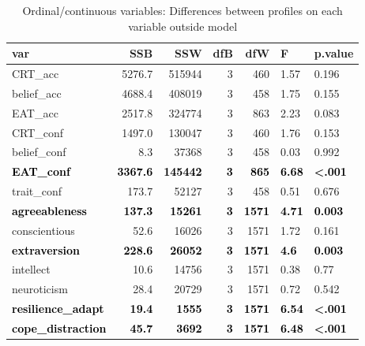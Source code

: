 \documentclass[]{article}
\begin{document}
\begin{table}[H]

\caption{\label{tab:unnamed-chunk-25}Ordinal/continuous variables: Differences between profiles on each variable outside model}
\centering
\fontsize{6}{8}\selectfont
\begin{tabular}[t]{lrrrrll}
\toprule
var & SSB & SSW & dfB & dfW & F & p.value\\
\midrule
CRT\_acc & 5276.7 & 515944 & 3 & 460 & 1.57 & 0.196\\
belief\_acc & 4688.4 & 408019 & 3 & 458 & 1.75 & 0.155\\
EAT\_acc & 2517.8 & 324774 & 3 & 863 & 2.23 & 0.083\\
CRT\_conf & 1497.0 & 130047 & 3 & 460 & 1.76 & 0.153\\
belief\_conf & 8.3 & 37368 & 3 & 458 & 0.03 & 0.992\\
\addlinespace
\textcolor{black}{\textbf{EAT\_conf}} & \textcolor{black}{\textbf{3367.6}} & \textcolor{black}{\textbf{145442}} & \textcolor{black}{\textbf{3}} & \textcolor{black}{\textbf{865}} & \textcolor{black}{\textbf{6.68}} & \textcolor{black}{\textbf{<.001}}\\
trait\_conf & 173.7 & 52127 & 3 & 458 & 0.51 & 0.676\\
\textcolor{black}{\textbf{agreeableness}} & \textcolor{black}{\textbf{137.3}} & \textcolor{black}{\textbf{15261}} & \textcolor{black}{\textbf{3}} & \textcolor{black}{\textbf{1571}} & \textcolor{black}{\textbf{4.71}} & \textcolor{black}{\textbf{0.003}}\\
conscientious & 52.6 & 16026 & 3 & 1571 & 1.72 & 0.161\\
\textcolor{black}{\textbf{extraversion}} & \textcolor{black}{\textbf{228.6}} & \textcolor{black}{\textbf{26052}} & \textcolor{black}{\textbf{3}} & \textcolor{black}{\textbf{1571}} & \textcolor{black}{\textbf{4.6}} & \textcolor{black}{\textbf{0.003}}\\
\addlinespace
intellect & 10.6 & 14756 & 3 & 1571 & 0.38 & 0.77\\
neuroticism & 28.4 & 20729 & 3 & 1571 & 0.72 & 0.542\\
\textcolor{black}{\textbf{resilience\_adapt}} & \textcolor{black}{\textbf{19.4}} & \textcolor{black}{\textbf{1555}} & \textcolor{black}{\textbf{3}} & \textcolor{black}{\textbf{1571}} & \textcolor{black}{\textbf{6.54}} & \textcolor{black}{\textbf{<.001}}\\
\textcolor{black}{\textbf{cope\_distraction}} & \textcolor{black}{\textbf{45.7}} & \textcolor{black}{\textbf{3692}} & \textcolor{black}{\textbf{3}} & \textcolor{black}{\textbf{1571}} & \textcolor{black}{\textbf{6.48}} & \textcolor{black}{\textbf{<.001}}\\

\end{tabular}
\end{table}
\end{document}
